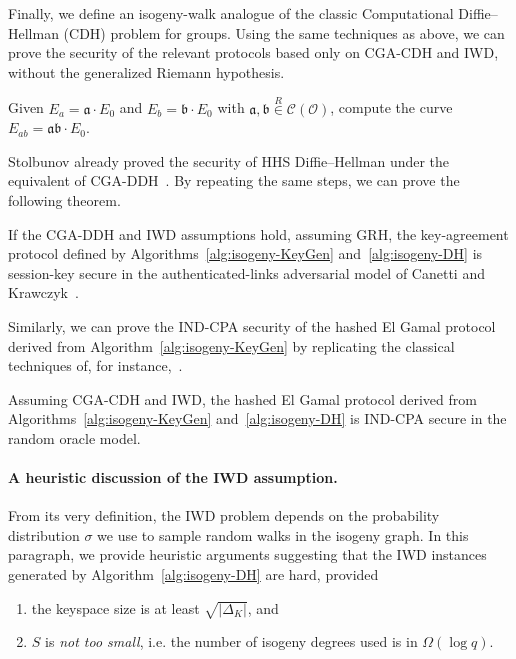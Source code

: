 \documentclass{llncs}
\newcommand{\Cl}{\mathcal{C}}
\renewcommand{\O}{\mathcal{O}}
\renewcommand{\frak}{\mathfrak}
\newcommand{\rand}[1]{\overset{#1}{∈}}
\newcommand{\uni}{\rand{R}}
\begin{document}
Finally, we define an isogeny-walk analogue of the classic 
Computational Diffie--Hellman (CDH) problem for groups.
Using the same techniques as above, we can prove the
security of the relevant protocols based only on CGA-CDH and IWD,
without the generalized Riemann hypothesis.

\begin{definition}
    Given $E_a=\frak a·E_0$ and $E_b=\frak b·E_0$ 
    with $\frak a,\frak b\uni\Cl(\O)$, 
    compute the curve $E_{ab}=\frak{ab}·E_0$.
\end{definition}

Stolbunov already proved
the security of HHS Diffie--Hellman under the equivalent of CGA-DDH~\cite{Stol}.
By repeating the same steps, we can prove the following theorem.

\begin{theorem}
    If the CGA-DDH and IWD assumptions hold, assuming GRH, 
    the key-agreement protocol defined by 
    Algorithms~\ref{alg:isogeny-KeyGen} and~\ref{alg:isogeny-DH}
    is session-key secure in the authenticated-links adversarial model 
    of Canetti and Krawczyk~\cite{canetti}.
\end{theorem}

Similarly, we can prove the IND-CPA security of the hashed El Gamal
protocol derived from Algorithm~\ref{alg:isogeny-KeyGen} by replicating the
classical techniques of, for
instance,~\cite[20.4.11]{galbraith2012mathematics}.

\begin{theorem}
    Assuming CGA-CDH and IWD, the hashed El Gamal protocol derived from
    Algorithms~\ref{alg:isogeny-KeyGen} and~\ref{alg:isogeny-DH}
    is IND-CPA secure in the random oracle model.
\end{theorem}


\paragraph{A heuristic discussion of the IWD assumption.}

From its very definition, the IWD problem depends on
the probability distribution $σ$ we use to sample
random walks in the isogeny graph. In this paragraph,
we provide heuristic arguments suggesting that 
the IWD instances generated by Algorithm~\ref{alg:isogeny-DH} are hard,
provided
\begin{enumerate}
    \item the keyspace size is at least $\sqrt{|Δ_K|}$, and
    \item $S$ is \emph{not too small}, i.e. the number of
        isogeny degrees used is in $\Omega(\log q)$.
\end{enumerate}
\end{document}
